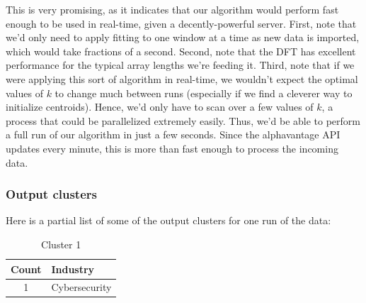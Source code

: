 \documentclass[final]{article}
\begin{document}
This is very promising, as it indicates that our algorithm would
perform fast enough to be used in real-time, given a decently-powerful
server. First, note that we'd only need to apply fitting to one window
at a time as new data is imported, which would take fractions of a
second. Second, note that the DFT has excellent performance for the
typical array lengths we're feeding it. Third, note that if we were
applying this sort of algorithm in real-time, we wouldn't expect the
optimal values of $k$ to change much between runs (especially if we
find a cleverer way to initialize centroids). Hence, we'd only have to
scan over a few values of $k$, a process that could be parallelized
extremely easily. Thus, we'd be able to perform a full run of our
algorithm in just a few seconds. Since the alphavantage API updates
every minute, this is more than fast enough to process the incoming
data.

\subsubsection{Output clusters}

Here is a partial list of some of the output clusters for one run of
the data:

\begin{table}[H]
\centering
\caption{Cluster 1}
\label{c1}
\begin{tabular}{@{}cl@{}}
\toprule
Count & Industry  \\ \midrule
1 & Cybersecurity \\
\bottomrule
\end{tabular}
\end{table}
\end{document}
